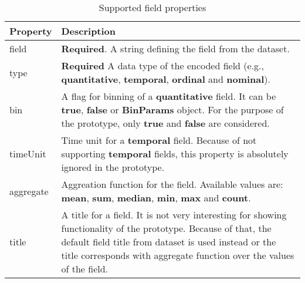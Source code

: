 \begin{table}[htbp]
      \centering
      \caption{Supported field properties\cite{vega-lite-channel-definition}}
      \label{table:channel-definition}
          \begin{tabular}{ m{8em} m{22em} }
          \toprule
              \textbf{Property} & \textbf{Description} \\
          \toprule

     field                         & \textbf{Required}. A string defining the field from the dataset. \\
\hline type    & \textbf{Required} A data type of the encoded field (e.g., \textbf{quantitative}, \textbf{temporal}, \textbf{ordinal} and \textbf{nominal}).  \\
\hline bin               & A flag for binning of a \textbf{quantitative} field. It can be \textbf{true}, \textbf{false} or \textbf{BinParams} object. For the purpose of the prototype, only \textbf{true} and \textbf{false} are considered.  \\
\hline timeUnit           & Time unit for a \textbf{temporal} field. Because of not supporting \textbf{temporal} fields, this property is absolutely ignored in the prototype. \\
\hline aggregate             & Aggreation function for the field. Available values are: \textbf{mean}, \textbf{sum}, \textbf{median}, \textbf{min}, \textbf{max} and \textbf{count}.  \\
\hline title     & A title for a field. It is not very interesting for showing functionality of the prototype. Because of that, the default field title from dataset is used instead or the title corresponds with aggregate function over the values of the field. \\
\hline
          \end{tabular}
      \end{table}
\clearpage
